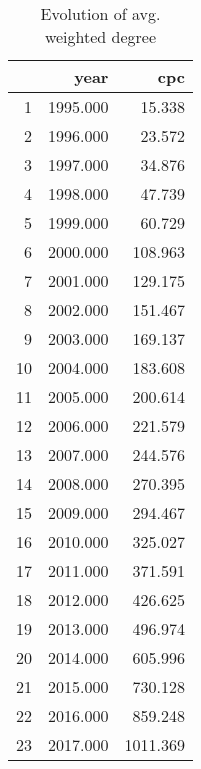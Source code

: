 \begin{table}[ht]
\centering
\begin{tabular}{rrr}
  \hline
 & year & cpc \\ 
  \hline
1 & 1995.000 & 15.338 \\ 
  2 & 1996.000 & 23.572 \\ 
  3 & 1997.000 & 34.876 \\ 
  4 & 1998.000 & 47.739 \\ 
  5 & 1999.000 & 60.729 \\ 
  6 & 2000.000 & 108.963 \\ 
  7 & 2001.000 & 129.175 \\ 
  8 & 2002.000 & 151.467 \\ 
  9 & 2003.000 & 169.137 \\ 
  10 & 2004.000 & 183.608 \\ 
  11 & 2005.000 & 200.614 \\ 
  12 & 2006.000 & 221.579 \\ 
  13 & 2007.000 & 244.576 \\ 
  14 & 2008.000 & 270.395 \\ 
  15 & 2009.000 & 294.467 \\ 
  16 & 2010.000 & 325.027 \\ 
  17 & 2011.000 & 371.591 \\ 
  18 & 2012.000 & 426.625 \\ 
  19 & 2013.000 & 496.974 \\ 
  20 & 2014.000 & 605.996 \\ 
  21 & 2015.000 & 730.128 \\ 
  22 & 2016.000 & 859.248 \\ 
  23 & 2017.000 & 1011.369 \\ 
   \hline
\end{tabular}
\caption{Evolution of avg. weighted degree} 
\end{table}
